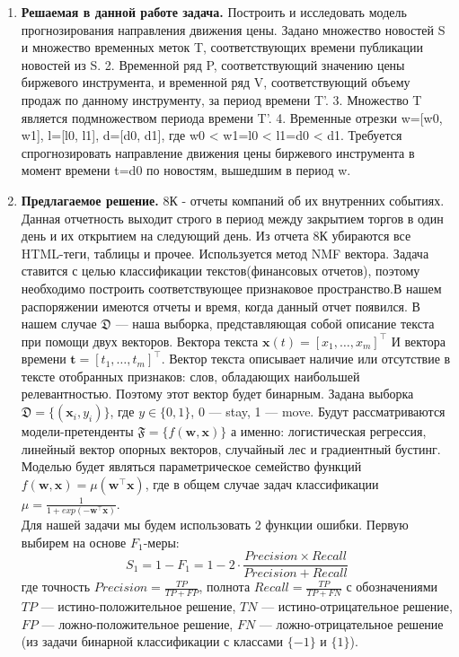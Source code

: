 \documentclass[12pt, twoside]{article}
\begin{document}
\begin{enumerate}
\item \textbf{Решаемая в данной работе задача.}
Построить и исследовать модель прогнозирования направления движения цены. Задано множество новостей S и множество временных меток T, соответствующих времени публикации новостей из S. 2. Временной ряд P, соответствующий значению цены биржевого инструмента, и временной ряд V, соответствующий объему продаж по данному инструменту, за период времени T'. 3. Множество T является подмножеством периода времени T'. 4. Временные отрезки w=[w0, w1], l=[l0, l1], d=[d0, d1], где w0 < w1=l0 < l1=d0 < d1. Требуется спрогнозировать направление движения цены биржевого инструмента в момент времени t=d0 по новостям, вышедшим в период w.

\item \textbf{Предлагаемое решение.}
8К - отчеты компаний об их внутренних событиях. Данная отчетность выходит строго в период между закрытием торгов в один день и их открытием на следующий день.
Из отчета 8К убираются все HTML-теги, таблицы и прочее.
Используется метод NMF вектора.
Задача ставится с целью классификации текстов(финансовых отчетов), поэтому необходимо построить соответствующее признаковое пространство.В нашем распоряжении имеются отчеты и время, когда данный отчет появился. В нашем случае $\mathfrak{D}$ --- наша выборка, представляющая собой описание текста при помощи двух векторов. Вектора текста $\mathbf{x}(t) = [x_1, \dots, x_m]^\top$ И вектора времени $\mathbf{t} = [t_1, \dots, t_m]^\top$. Вектор текста  описывает наличие или отсутствие в тексте  отобранных признаков: слов, обладающих наибольшей релевантностью. Поэтому этот вектор будет бинарным. Задана выборка $\mathfrak{D} = \{(\mathbf{x}_i, y_i)\}$, где $y \in \{0, 1\}$, 0 --- stay, 1 --- move. Будут рассматриваются модели-претенденты $\mathfrak{F} = \{f(\mathbf{w, x})\}$ а именно: логистическая регрессия, линейный вектор опорных векторов, случайный лес и градиентный бустинг. Моделью будет являться параметрическое семейство функций $f(\mathbf{w, x}) = \mu (\mathbf{w}^\top \mathbf{x})$, где в общем случае задач классификации $\mu = \frac{1}{1 + exp(-\mathbf{w}^\top \mathbf{x})}$. \\
Для нашей задачи мы будем использовать 2 функции ошибки. Первую выбирем на основе $F_1$-меры: $$S_1 = 1 - F_1 = 1 - 2 \cdot \frac{Precision \times Recall}{Precision + Recall}$$ где точность $Precision = \frac{TP}{TP + FP}$, полнота $Recall = \frac{TP}{TP + FN}$ с обозначениями $TP$ --- истино-положительное решение, $TN$ --- истино-отрицательное решение, $FP$ --- ложно-положительное решение, $FN$ --- ложно-отрицательное решение (из задачи бинарной классификации с классами $\{-1\}$ и $\{1\}$).

\end{enumerate}
\end{document}
